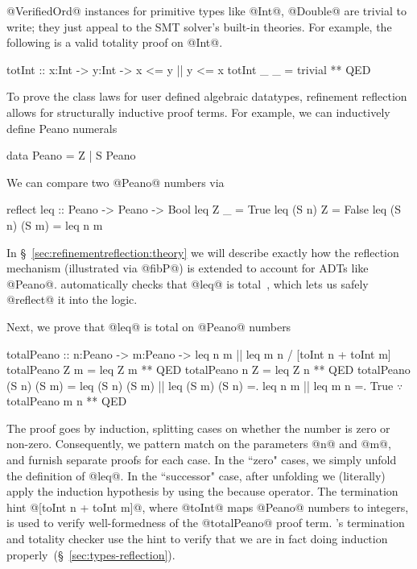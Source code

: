 


@VerifiedOrd@ instances for primitive types like @Int@, @Double@ are trivial to
write; they just appeal to the SMT solver's built-in theories.
%
For example, the following is a valid totality proof on @Int@.
\begin{code}
  totInt :: x:Int -> y:Int -> {x <= y || y <= x}
  totInt _ _ = trivial ** QED
\end{code}

%
To prove the class laws for user defined algebraic datatypes,
refinement reflection allows for structurally inductive proof terms.
%
For example, we can inductively define Peano numerals
%
\begin{code}
  data Peano = Z | S Peano
\end{code}
%
We can compare two @Peano@ numbers via
\begin{code}
  reflect leq :: Peano -> Peano -> Bool
  leq Z _         = True
  leq (S n) Z     = False
  leq (S n) (S m) = leq n m
\end{code}
%
In \S~\ref{sec:refinementreflection:theory} we will describe
exactly how the reflection mechanism (illustrated
via @fibP@) is extended to account for ADTs like @Peano@.
%
\toolname automatically checks
that @leq@ is total~\citep{Vazou14}, which
lets us safely @reflect@ it into the logic.

Next, we prove that @leq@ is total on @Peano@ numbers
%
\begin{mcode}
  totalPeano :: n:Peano -> m:Peano -> {leq n m || leq m n}
             /  [toInt n + toInt m]
  totalPeano Z m = leq Z m ** QED
  totalPeano n Z = leq Z n ** QED
  totalPeano (S n) (S m)
   =  leq (S n) (S m) || leq (S m) (S n)
   =. leq n m || leq m n
   =. True $\because$ totalPeano m n
   ** QED
\end{mcode}
The proof goes by induction, splitting cases on
whether the number is zero or non-zero. Consequently,
we pattern match on the parameters @n@ and @m@, and furnish
separate proofs for each case.
%
In the ``zero" cases, we simply unfold the definition
of @leq@.
%
In the ``successor" case, after unfolding we (literally)
apply the induction hypothesis by using the because operator.
%
The termination hint @[toInt n + toInt m]@,
where @toInt@ maps @Peano@ numbers to integers,
is used to verify well-formedness of the @totalPeano@
proof term.
%
\toolname's termination and totality checker
use the hint to
verify that we are in fact doing induction
properly~(\S~\ref{sec:types-reflection}).

